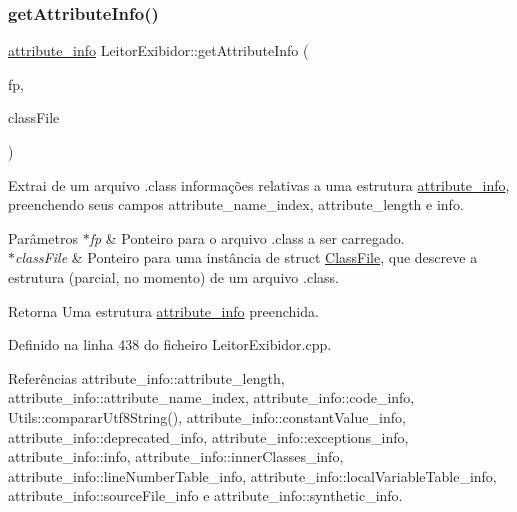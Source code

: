 \mbox{\label{classLeitorExibidor_a81a7c01ab5ad3fb4fb1bb524d85ee5c0}} 
\subsubsection{\texorpdfstring{get\+Attribute\+Info()}{getAttributeInfo()}}
{\footnotesize\ttfamily \hyperlink{structattribute__info}{attribute\+\_\+info} Leitor\+Exibidor\+::get\+Attribute\+Info (\begin{DoxyParamCaption}\item[{F\+I\+LE $\ast$}]{fp,  }\item[{\hyperlink{classClassFile}{Class\+File} $\ast$}]{class\+File }\end{DoxyParamCaption})\hspace{0.3cm}{\ttfamily [private]}}

Extrai de um arquivo .class informações relativas a uma estrutura \hyperlink{structattribute__info}{attribute\+\_\+info}, preenchendo seus campos attribute\+\_\+name\+\_\+index, attribute\+\_\+length e info. 
\begin{DoxyParams}{Parâmetros}
{\em $\ast$fp} & Ponteiro para o arquivo .class a ser carregado. \\
\hline
{\em $\ast$class\+File} & Ponteiro para uma instância de struct \hyperlink{classClassFile}{Class\+File}, que descreve a estrutura (parcial, no momento) de um arquivo .class. \\
\hline
\end{DoxyParams}
\begin{DoxyReturn}{Retorna}
Uma estrutura \hyperlink{structattribute__info}{attribute\+\_\+info} preenchida. 
\end{DoxyReturn}


Definido na linha 438 do ficheiro Leitor\+Exibidor.\+cpp.



Referências attribute\+\_\+info\+::attribute\+\_\+length, attribute\+\_\+info\+::attribute\+\_\+name\+\_\+index, attribute\+\_\+info\+::code\+\_\+info, Utils\+::comparar\+Utf8\+String(), attribute\+\_\+info\+::constant\+Value\+\_\+info, attribute\+\_\+info\+::deprecated\+\_\+info, attribute\+\_\+info\+::exceptions\+\_\+info, attribute\+\_\+info\+::info, attribute\+\_\+info\+::inner\+Classes\+\_\+info, attribute\+\_\+info\+::line\+Number\+Table\+\_\+info, attribute\+\_\+info\+::local\+Variable\+Table\+\_\+info, attribute\+\_\+info\+::source\+File\+\_\+info e attribute\+\_\+info\+::synthetic\+\_\+info.

